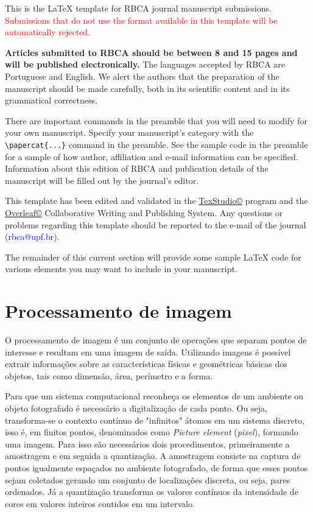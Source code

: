 \documentclass[a4paper,alpha-refs]{RBCA_v1.0}
\begin{document}
This is the \LaTeX{} template for RBCA journal manuscript submissions. \textcolor{red}{Submissions that do not use the format available in this template will be automatically rejected.} 

\textbf{Articles submitted to RBCA should be between 8 and 15 pages and will be published electronically.} The languages accepted by RBCA are Portuguese and English. We alert the authors that the preparation of the manuscript should be made carefully, both in its scientific content and in its grammatical correctness.

There are important commands in the preamble that you will need to modify for your own manuscript. Specify your manuscript's category with the \verb|\papercat{...}| command in the preamble. See the sample code in the preamble for a sample of how author, affiliation and e-mail information can be specified. Information about this edition of RBCA and publication details of the manuscript will be filled out by the journal's editor.

This template has been edited and validated in the \href{http://www.texstudio.org/}{TexStudio\copyright} program and the \href{https://www.overleaf.com/}{Overleaf\copyright} Collaborative Writing and Publishing System. Any questions or problems regarding this template should be reported to the e-mail of the journal (\textcolor{blue}{rbca@upf.br}).

The remainder of this current section will provide some sample \LaTeX{} code for various elements you may want to include in your manuscript.

\section{Processamento de imagem}

O processamento de imagem é um conjunto de operações que separam pontos de interesse e resultam em uma imagem de saída. Utilizando imagens é possível extrair informações sobre as características físicas e geométricas básicas dos objetos, tais como dimensão, área, perímetro e a forma.

Para que um sistema computacional reconheça os elementos de um ambiente ou objeto fotografado é necessário a digitalização de cada ponto. Ou seja, transforma-se o contexto contínuo de "infinitos" átomos em um sistema discreto, isso é, em finitos pontos, denominados como \textit{Picture element} (\textit{pixel}), formando uma imagem. Para isso são necessários dois procedimentos, primeiramente a amostragem e em seguida a quantização. A amostragem consiste na captura de pontos igualmente espaçados no ambiente fotografado, de forma que esses pontos sejam coletados gerando um conjunto de localizações discreta, ou seja, pares ordenados. Já a quantização transforma os valores contínuos da intensidade de cores em valores inteiros contidos em um intervalo. 
\end{document}
